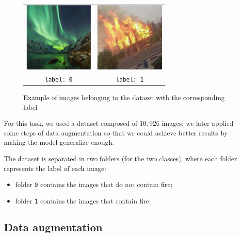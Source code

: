 \documentclass[11pt, journal]{IEEEtran}
\newcommand{\nl}{

\medskip

}
\newcommand{\nl}{

\medskip

}
\begin{document}
\begin{figure}
    \label{dataset_example}
    \centering
    \begin{tabular}{c c}
        \includegraphics[width = 3.5cm]{imgs/no_fire.jpg} & \includegraphics[width = 3.5cm]{imgs/fire.jpg}
        \\
        \texttt{label: 0} & \texttt{label: 1}
    \end{tabular}
    \caption{Example of images belonging to the dataset with the corresponding label}
\end{figure}

For this task, we used a dataset composed of $10,926$ images; we later applied some steps of data augmentation so that we could achieve better results by making the model generalize enough.
\nl
The dataset is separated in two folders (for the two classes), where each folder represents the label of each image:
\begin{itemize}
    \item folder \verb|0| contains the images that do not contain fire;
    \item folder \verb|1| contains the images that contain fire;
\end{itemize}

\subsection{Data augmentation}
\end{document}

